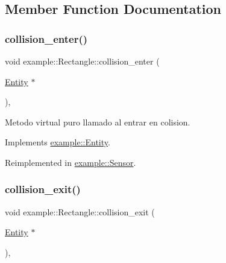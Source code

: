 \subsection{Member Function Documentation}
\mbox{\label{classexample_1_1_rectangle_a60fa2e1468370d1c7021f25df8a4c1d7}} 
\subsubsection{\texorpdfstring{collision\_enter()}{collision\_enter()}}
{\footnotesize\ttfamily void example\+::\+Rectangle\+::collision\+\_\+enter (\begin{DoxyParamCaption}\item[{\mbox{\hyperlink{classexample_1_1_entity}{Entity}} $\ast$}]{ }\end{DoxyParamCaption})\hspace{0.3cm}{\ttfamily [override]}, {\ttfamily [virtual]}}



Metodo virtual puro llamado al entrar en colision. 



Implements \mbox{\hyperlink{classexample_1_1_entity_a09f6836192c2f8bce91a7b4f6934b94e}{example\+::\+Entity}}.



Reimplemented in \mbox{\hyperlink{classexample_1_1_sensor_a3134d06af95de83a7392c3687411eb17}{example\+::\+Sensor}}.

\mbox{\label{classexample_1_1_rectangle_a547c35d87f139ffc190f542830606754}} 
\subsubsection{\texorpdfstring{collision\_exit()}{collision\_exit()}}
{\footnotesize\ttfamily void example\+::\+Rectangle\+::collision\+\_\+exit (\begin{DoxyParamCaption}\item[{\mbox{\hyperlink{classexample_1_1_entity}{Entity}} $\ast$}]{ }\end{DoxyParamCaption})\hspace{0.3cm}{\ttfamily [override]}, {\ttfamily [virtual]}}



